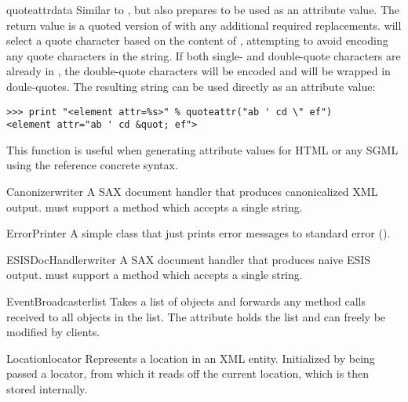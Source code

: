 \documentclass{howto}
\begin{document}
\begin{funcdesc}{quoteattr}{data}
  Similar to , but also prepares  to be
  used as an attribute value.  The return value is a quoted version of
   with any additional required replacements.
   will select a quote character based on the
  content of , attempting to avoid encoding any quote
  characters in the string.  If both single- and double-quote
  characters are already in , the double-quote characters
  will be encoded and  will be wrapped in doule-quotes.  The
  resulting string can be used directly as an attribute value:

\begin{verbatim}
>>> print "<element attr=%s>" % quoteattr("ab ' cd \" ef")
<element attr="ab ' cd &quot; ef">
\end{verbatim}

  This function is useful when generating attribute values for HTML or
  any SGML using the reference concrete syntax.
\end{funcdesc}

\begin{classdesc}{Canonizer}{writer}
A SAX document handler that produces canonicalized XML output.
 must support a  method which accepts a
single string.  
\end{classdesc}

\begin{classdesc}{ErrorPrinter}{}
A simple class that just prints error messages to standard error ().
\end{classdesc}

\begin{classdesc}{ESISDocHandler}{writer}
A SAX document handler that produces naive ESIS output.
 must support a  method which accepts a single string. 
\end{classdesc}

\begin{classdesc}{EventBroadcaster}{list}
Takes a list of objects and forwards any method calls received
    to all objects in the list. The attribute  holds the list and
    can freely be modified by clients.
\end{classdesc}

\begin{classdesc}{Location}{locator}
Represents a location in an XML entity. Initialized by being passed
a locator, from which it reads off the current location, which is then
stored internally.
\end{classdesc}
\end{document}
